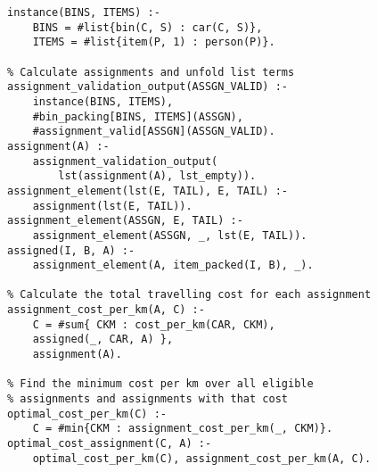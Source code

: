 \begin{example}
\begin{lstlisting}[style=asp-code, label={lst:bin-packing-main}, caption={Main Program}]
% Create input instance for bin-packing module
instance(BINS, ITEMS) :- 
	BINS = #list{bin(C, S) : car(C, S)}, 
	ITEMS = #list{item(P, 1) : person(P)}.

% Calculate assignments and unfold list terms
assignment_validation_output(ASSGN_VALID) :- 
	instance(BINS, ITEMS), 
	#bin_packing[BINS, ITEMS](ASSGN), 
	#assignment_valid[ASSGN](ASSGN_VALID).
assignment(A) :- 
	assignment_validation_output(
		lst(assignment(A), lst_empty)).
assignment_element(lst(E, TAIL), E, TAIL) :- 
	assignment(lst(E, TAIL)).
assignment_element(ASSGN, E, TAIL) :- 
	assignment_element(ASSGN, _, lst(E, TAIL)).
assigned(I, B, A) :- 
	assignment_element(A, item_packed(I, B), _).

% Calculate the total travelling cost for each assignment
assignment_cost_per_km(A, C) :- 
	C = #sum{ CKM : cost_per_km(CAR, CKM), 
	assigned(_, CAR, A) }, 
	assignment(A).

% Find the minimum cost per km over all eligible 
% assignments and assignments with that cost
optimal_cost_per_km(C) :- 
	C = #min{CKM : assignment_cost_per_km(_, CKM)}.
optimal_cost_assignment(C, A) :- 
	optimal_cost_per_km(C), assignment_cost_per_km(A, C).	
\end{lstlisting}
\end{example}

